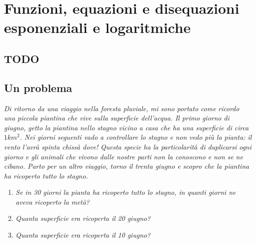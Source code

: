 


\chapter[Esponenziali e logaritmi]{Funzioni, equazioni e disequazioni 
esponenziali e logaritmiche}

\section{TODO}

\section{Un problema}
\label{sec:esplog_problemi}

\emph{
Di ritorno da una viaggio nella foresta pluviale, mi sono portato come ricordo 
una piccola piantina che vive sulla superficie dell'acqua. 
Il primo giorno di giugno, getto la piantina nello stagno vicino a casa che ha 
una superficie di circa \(1km^2\).
Nei giorni seguenti vado a controllare lo stagno e non vedo più la pianta: il 
vento l'avrà spinta chissà dove! 
Questa specie ha la particolarità di duplicarsi ogni giorno e gli animali che 
vivono dalle nostre parti non la conoscono e non se ne cibano.
Parto per un altro viaggio, torno il trenta giugno e scopro che la piantina 
ha ricoperto tutto lo stagno.}

\begin{enumerate}
 \item
\emph{Se in 30 giorni la pianta ha ricoperto tutto lo stagno, in quanti giorni 
ne aveva ricoperto la metà?}
 \item 
\emph{Quanta superficie era ricoperta il 20 giugno?}
 \item 
\emph{Quanta superficie era ricoperta il 10 giugno?}
\end{enumerate}

